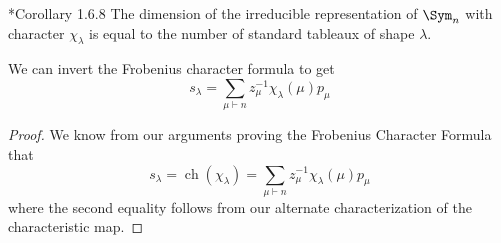 \documentclass[11pt,leqno,oneside]{amsart}
\numberwithin{thm}{section}
\newcommand{\partitionof}{\vdash}
\newcommand{\ch}{\operatorname{ch}}
\begin{document}
\begin{cor}
  \cite{manivel}*{Corollary 1.6.8} The dimension of the irreducible representation of \(\Sym_n\) with
  character \(\chi_\lambda\) is equal to the number of standard
  tableaux of shape \(\lambda\).
\end{cor}
\begin{cor}
  We can invert the Frobenius character formula to get \[
    s_\lambda = \sum_{\mu \partitionof n} z_\mu^{-1} \chi_\lambda(\mu) p_\mu
  \]
\end{cor}
\begin{proof}
  We know from our arguments proving the Frobenius Character Formula that \[
    s_\lambda = \ch(\chi_\lambda) = \sum_{\mu \partitionof n}
    z_\mu^{-1} \chi_\lambda(\mu) p_\mu
  \]
  where the second equality follows from our alternate
  characterization of the characteristic map.
\end{proof}
\end{document}
